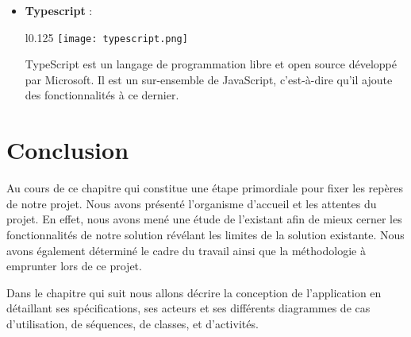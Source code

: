 \begin{itemize}
    \item \textbf{Typescript} :\\
    \begin{minipage}{\linewidth}
      \begin{wrapfigure}{l}{0.125\textwidth}
        \vspace{-0.5cm}
        \texttt{[image: typescript.png]} 
      \end{wrapfigure}
      TypeScript est un langage de programmation libre et open source développé par Microsoft. Il est un sur-ensemble de JavaScript, c'est-à-dire qu'il ajoute des fonctionnalités à ce dernier.
    \end{minipage}
  
  \end{itemize}



\section*{Conclusion}
Au cours de ce chapitre qui constitue une étape primordiale pour fixer les repères de notre projet. Nous avons présenté l'organisme d'accueil et les attentes du projet. En effet, nous avons mené une étude de l'existant afin de mieux cerner les fonctionnalités de notre solution révélant les limites de la solution existante. Nous avons également déterminé le cadre du travail ainsi que la méthodologie à emprunter lors de ce projet.

Dans le chapitre qui suit nous allons décrire la conception de l'application en détaillant ses spécifications, ses acteurs et ses différents diagrammes de cas d'utilisation, de séquences, de classes, et d'activités.


